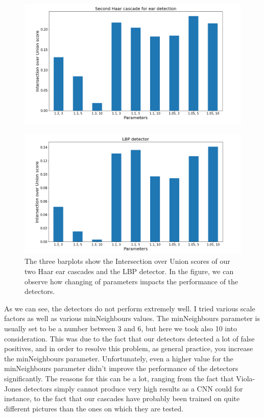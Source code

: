 \documentclass[9pt]{IEEEtran}
\begin{document}
\begin{figure}[H]
    \centering
    \includegraphics[width=1\columnwidth]{plot_1.2}
    \label{fig:plot_1.2}
\end{figure}

\begin{figure}[H]
    \centering
    \includegraphics[width=1\columnwidth]{plot_1.3}
    \caption{The three barplots show the Intersection over Union scores of our two Haar ear cascades and the LBP detector. In the figure, we can observe how changing of parameters impacts the performance of the detectors.}
    \label{fig:plot_1.3}
\end{figure}

As we can see, the detectors do not perform extremely well. I tried various scale factors as well as various minNeighbours values. The minNeighbours parameter is usually set to be a number between 3 and 6, but here we took also 10 into consideration. This was due to the fact that our detectors detected a lot of false positives, and in order to resolve this problem, as general practice, you increase the minNeighbours parameter. Unfortunately, even a higher value for the minNeighbours parameter didn't improve the performance of the detectors significantly. The reasons for this can be a lot, ranging from the fact that Viola-Jones detectors simply cannot produce very high results as a CNN could for instance, to the fact that our cascades have probably been trained on quite different pictures than the ones on which they are tested. 
\end{document}
